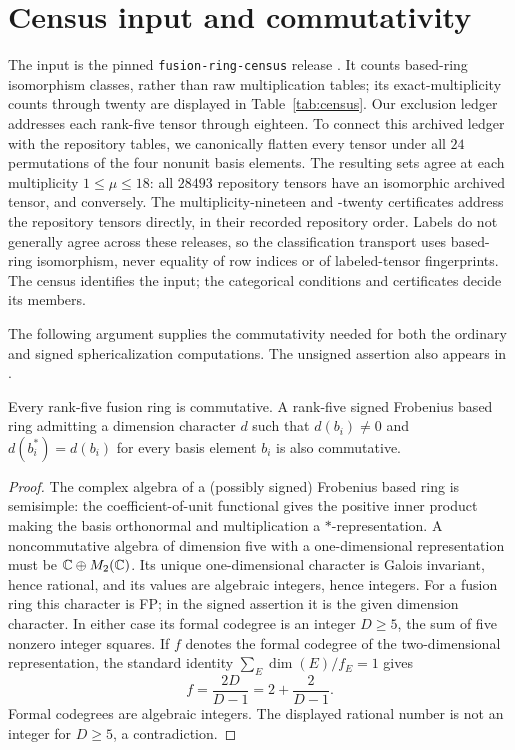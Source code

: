\section{Census input and commutativity}\label{sec:data}
The input is the pinned \texttt{fusion-ring-census} release
\cite{Census}. It counts based-ring isomorphism classes, rather than
raw multiplication tables; its exact-multiplicity counts through twenty
are displayed in Table~\ref{tab:census}. Our exclusion ledger addresses
each rank-five tensor through eighteen. To connect this archived ledger
with the repository tables, we canonically flatten every tensor under
all $24$ permutations of the four nonunit basis elements. The resulting
sets agree at each multiplicity $1\le\mu\le18$: all $28493$ repository
tensors have an isomorphic archived tensor, and conversely. The
multiplicity-nineteen and -twenty certificates address the repository
tensors directly, in their recorded repository order. Labels do
not generally agree across these releases, so the classification
transport uses based-ring isomorphism, never equality of row indices
or of labeled-tensor fingerprints. The census identifies the input;
the categorical conditions and certificates decide its members.

The following argument supplies the commutativity needed for both the
ordinary and signed sphericalization computations. The unsigned assertion
also appears in \cite[Proposition 9.2]{ABDP}.

\begin{lemma}\label{lem:commutativity}
Every rank-five fusion ring is commutative. A rank-five signed Frobenius
based ring admitting a dimension character $d$ such that
$d(b_i)\ne0$ and $d(b_i^*)=d(b_i)$ for every basis element $b_i$ is also
commutative.
\end{lemma}
\begin{proof}
The complex algebra of a (possibly signed) Frobenius based ring is
semisimple: the coefficient-of-unit functional gives the positive
inner product making the basis orthonormal and multiplication a
$*$-representation. A noncommutative algebra of dimension five with a
one-dimensional representation must be $\mathbb C\oplus M_2(\mathbb C)$.
Its unique one-dimensional character is Galois invariant, hence rational,
and its values are algebraic integers, hence integers.
For a fusion ring this character is FP; in the signed assertion it is
the given dimension character. In either case its formal codegree is an
integer $D\geq5$, the sum of five nonzero integer squares.
If $f$ denotes the formal codegree of the two-dimensional representation,
the standard identity $\sum_E\dim(E)/f_E=1$ gives
\[
 f=\frac{2D}{D-1}=2+\frac2{D-1}.
\]
Formal codegrees are algebraic integers. The displayed rational number
is not an integer for $D\geq5$, a contradiction.
\end{proof}


